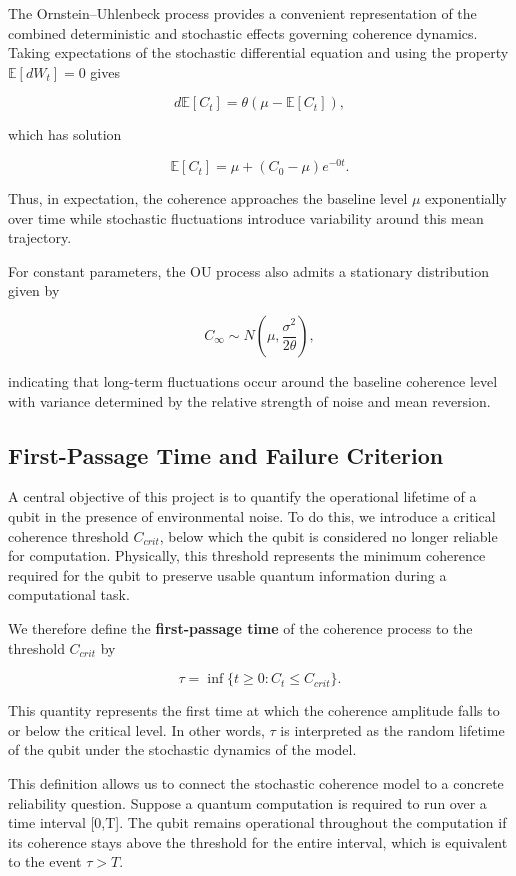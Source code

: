 \documentclass[
	a4paper, %
	10pt, %
	unnumberedsections, %
	twoside, %
]{LTJournalArticle}
\def\[{ \begin{equation} }
\def\]{ \end{equation} }
\begin{document}
The Ornstein--Uhlenbeck process provides a convenient representation of the combined deterministic and stochastic effects governing coherence dynamics. Taking expectations of the stochastic differential equation and using the property $\mathbb{E}[dW_t]=0$ gives

\[
d\mathbb{E}[C_t]=\theta(\mu - \mathbb{E}[C_t]),
\]

which has solution

\[
\mathbb{E}[C_t]=\mu+(C_0-\mu)e^{-0t}.
\]

Thus, in expectation, the coherence approaches the baseline level $\mu$ exponentially over time while stochastic fluctuations introduce variability around this mean trajectory.

For constant parameters, the OU process also admits a stationary distribution given by \autocite{mazzolo2024first}

\[
C_\infty \sim N(\mu, \dfrac{\sigma^2}{2\theta}),
\]

indicating that long-term fluctuations occur around the baseline coherence level with variance determined by the relative strength of noise and mean reversion.

\subsection{First-Passage Time and Failure Criterion}

A central objective of this project is to quantify the operational lifetime of a qubit in the presence of environmental noise. To do this, we introduce a critical coherence threshold 
$C_{crit}$, below which the qubit is considered no longer reliable for computation. Physically, this threshold represents the minimum coherence required for the qubit to preserve usable quantum information during a computational task.

We therefore define the \textbf{first-passage time} of the coherence process to the threshold 
$C_{crit}$ by 

\[
\tau = \inf\{t\ge0:C_t \le C_{crit}\}.
\]

This quantity represents the first time at which the coherence amplitude falls to or below the critical level. In other words, $\tau$ is interpreted as the random lifetime of the qubit under the stochastic dynamics of the model.

This definition allows us to connect the stochastic coherence model to a concrete reliability question. Suppose a quantum computation is required to run over a time interval 
[0,T]. The qubit remains operational throughout the computation if its coherence stays above the threshold for the entire interval, which is equivalent to the event $\tau > T$. 
\end{document}
